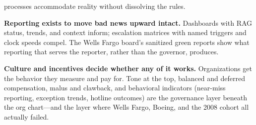 \documentclass[11pt,openany]{book}
\begin{document}
\begin{keytakeaways}
        processes accommodate reality without dissolving the rules.
  \item \textbf{Reporting exists to move bad news upward intact.} Dashboards
        with RAG status, trends, and context inform; escalation matrices
        with named triggers and clock speeds compel. The Wells Fargo board's
        sanitized green reports show what reporting that serves the
        reporter, rather than the governor, produces.
  \item \textbf{Culture and incentives decide whether any of it works.}
        Organizations get the behavior they measure and pay for. Tone at the
        top, balanced and deferred compensation, malus and clawback, and
        behavioral indicators (near-miss reporting, exception trends,
        hotline outcomes) are the governance layer beneath the org
        chart---and the layer where Wells Fargo, Boeing, and the 2008 cohort
        all actually failed.
\end{keytakeaways}
\end{document}
